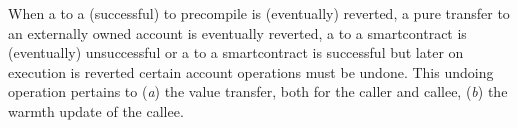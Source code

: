 \begin{center}
\end{center}
When a to
a (successful)  to precompile is (eventually) reverted,
a pure transfer to an externally owned account is eventually reverted,
a  to a smartcontract is (eventually) unsuccessful or
a  to a smartcontract is successful but later on execution is reverted
certain account operations must be undone.
This undoing operation pertains to
(\emph{a}) the value transfer, both for the caller and callee,
(\emph{b}) the warmth update of the callee.
